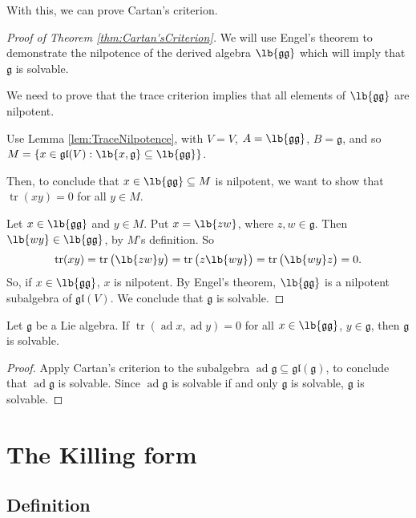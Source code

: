 \documentclass{article}
\DeclarePairedDelimiter\lb\lbrack\rbrack
\DeclareMathOperator{\tr}{tr}
\newcommand*\ad{\operatorname{ad}}
\newcommand*\frkg{{\ensuremath{\mathfrak{g}}}}
\newcommand*\gl{\ensuremath{\mathfrak{gl}}}
\begin{document}
With this, we can prove Cartan's criterion.

\begin{proof}[Proof of Theorem \ref{thm:Cartan'sCriterion}]
    We will use Engel's theorem to demonstrate the nilpotence of the derived algebra $\lb{\frkg\frkg}$ which will imply that $\frkg$ is solvable.

    We need to prove that the trace criterion implies that all elements of $\lb{\frkg\frkg}$ are nilpotent.

    Use Lemma \ref{lem:TraceNilpotence}, with $V = V$, $A = \lb{\frkg\frkg}$, $B = \frkg$, and so $M = \{x \in \gl(V): \lb{x,\frkg} \subseteq \lb{\frkg\frkg}\}$.

    Then, to conclude that $x \in \lb{\frkg\frkg} \subseteq M$ is nilpotent, we want to show that $\tr(xy) = 0$ for all $y \in M$.

    Let $x \in \lb{\frkg\frkg}$ and $y \in M$.
    Put $x = \lb{zw}$, where $z,w \in \frkg$.
    Then $\lb{wy} \in \lb{\frkg\frkg}$, by $M$'s definition.
    So
    \[
        \tr(xy)
        =
        \tr\big(\lb{zw}y\big)
        =
        \tr\big(z\lb{wy}\big)
        =
        \tr\big(\lb{wy}z\big)
        =
        0.
    \]
    So, if $x \in \lb{\frkg\frkg}$, $x$ is nilpotent.
    By Engel's theorem, $\lb{\frkg\frkg}$ is a nilpotent subalgebra of $\gl(V)$.
    We conclude that $\frkg$ is solvable.
\end{proof}

\begin{corollary}
    Let $\frkg$ be a Lie algebra.
    If $\tr(\ad x, \ad y) = 0$ for all $x \in \lb{\frkg\frkg}$, $y \in \frkg$, then $\frkg$ is solvable.
\end{corollary}

\begin{proof}
    Apply Cartan's criterion to the subalgebra $\ad \frkg \subseteq \gl(\frkg)$, to conclude that $\ad \frkg$ is solvable.
    Since $\ad \frkg$ is solvable if and only $\frkg$ is solvable, $\frkg$ is solvable.
\end{proof}


\section{The Killing form \cite[\S 5]{Hum72}}

\subsection{Definition}
\end{document}
